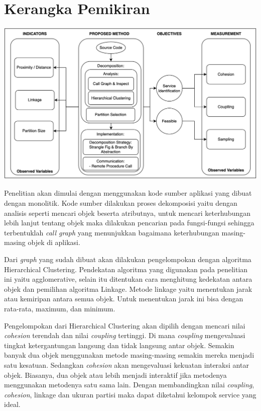 \section{Kerangka Pemikiran}
\begin{center}
	\includegraphics[width=14cm]{img/bab_3/KerangkaPemikiran.png}
	\label{fig:kerangka_pemikiran}
\end{center}

Penelitian akan dimulai dengan menggunakan kode sumber aplikasi yang dibuat dengan monolitik. Kode sumber dilakukan proses dekomposisi yaitu dengan analisis seperti mencari objek beserta atributnya, untuk mencari keterhubungan lebih lanjut tentang objek maka dilakukan pencarian pada fungsi-fungsi sehingga terbentuklah \textit{call graph} yang menunjukkan bagaimana keterhubungan masing-masing objek di aplikasi.

Dari \textit{graph} yang sudah dibuat akan dilakukan pengelompokan dengan algoritma Hierarchical Clustering. Pendekatan algoritma yang digunakan pada penelitian ini yaitu agglomerative, selain itu ditentukan cara menghitung kedekatan antara objek dan pemilihan algoritma Linkage. Metode linkage yaitu menentukan jarak atau kemiripan antara semua objek. Untuk menentukan jarak ini bisa dengan rata-rata, maximum, dan minimum. 

Pengelompokan dari Hierarchical Clustering akan dipilih dengan mencari nilai \textit{cohesion} terendah dan  nilai \textit{coupling} tertinggi. Di mana \textit{coupling} mengevaluasi tingkat ketergantungan langsung dan tidak langsung antar objek. Semakin banyak dua objek menggunakan metode masing-masing semakin mereka menjadi satu kesatuan. Sedangkan  \textit{cohesion} akan mengevaluasi kekuatan interaksi antar objek. Biasanya, dua objek atau lebih menjadi interaktif jika metodenya menggunakan metodenya satu sama lain. Dengan membandingkan nilai  \textit{coupling}, \textit{cohesion}, linkage dan ukuran partisi maka dapat diketahui kelompok service yang ideal.

